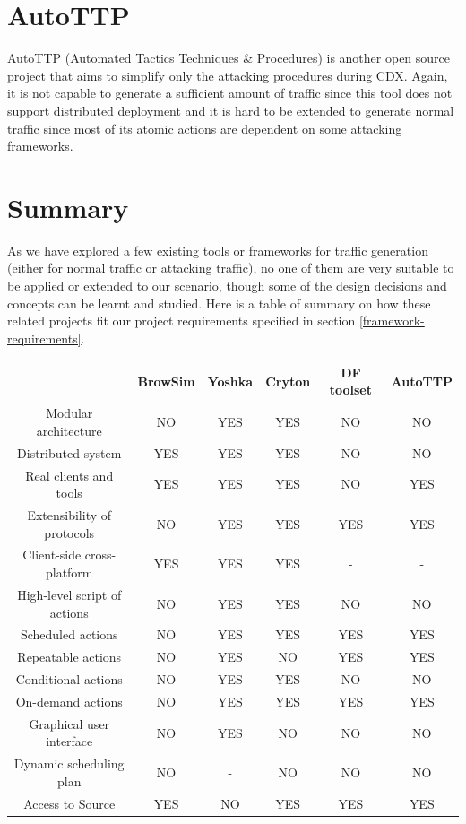 \documentclass[12pt]{report}
\begin{document}
\section{AutoTTP}
AutoTTP (Automated Tactics Techniques \& Procedures) \citep{AutoTTP} is another open source project that aims to simplify only the attacking procedures during CDX. Again, it is not capable to generate a sufficient amount of traffic since this tool does not support distributed deployment and it is hard to be extended to generate normal traffic since most of its atomic actions are dependent on some attacking frameworks.\\

\section{Summary}
As we have explored a few existing tools or frameworks for traffic generation (either for normal traffic or attacking traffic), no one of them are very suitable to be applied or extended to our scenario, though some of the design decisions and concepts can be learnt and studied. Here is a table of summary on how these related projects fit our project requirements specified in section \ref{framework-requirements}.\\

\setlength{\parindent}{20pt}
\begin{tabular}{ | c | c | c | c | c | c |}
\hline
                     & BrowSim & Yoshka & Cryton & DF toolset & AutoTTP\\
\hline
Modular architecture & NO & YES & YES & NO & NO \\
\hline
Distributed system & YES & YES & YES & NO & NO \\
\hline
Real clients and tools & YES & YES & YES & NO & YES \\
\hline
Extensibility of protocols & NO & YES & YES & YES & YES \\
\hline
Client-side cross-platform & YES & YES & YES & - & - \\
\hline
High-level script of actions & NO & YES & YES & NO & NO \\
\hline
Scheduled actions & NO & YES & YES & YES & YES \\
\hline
Repeatable actions & NO & YES & NO & YES & YES \\
\hline
Conditional actions & NO & YES & YES & NO & NO \\
\hline
On-demand actions & NO & YES & YES & YES & YES \\
\hline
Graphical user interface & NO & YES & NO & NO & NO \\
\hline
Dynamic scheduling plan & NO & - & NO & NO & NO \\
\hline
Access to Source & YES & NO & YES & YES & YES \\
\hline

\end{tabular}
\end{document}
